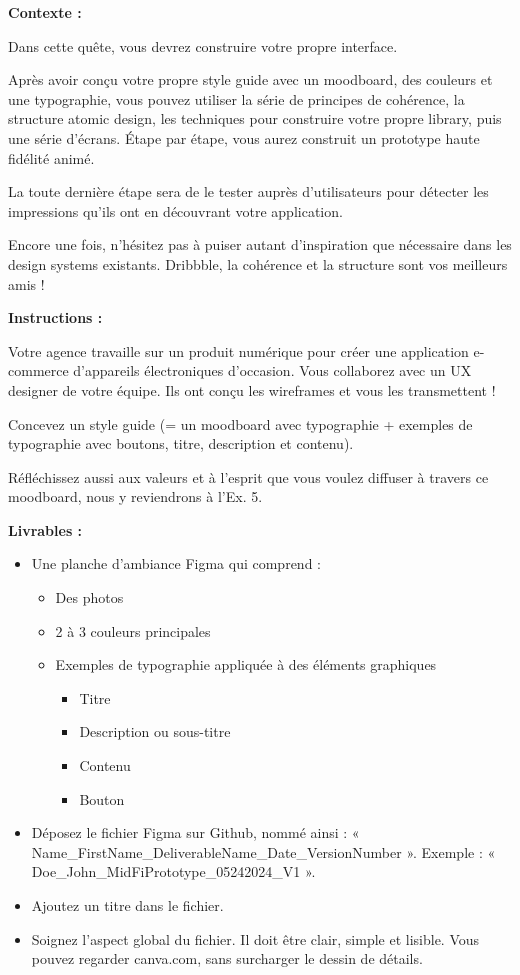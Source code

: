 \makeheaderfiles

\textbf{Contexte :}

Dans cette quête, vous devrez construire votre propre interface.

Après avoir conçu votre propre style guide avec un moodboard, des couleurs et une typographie, vous pouvez utiliser la série de principes de cohérence, la structure atomic design, les techniques pour construire votre propre library, puis une série d'écrans. Étape par étape, vous aurez construit un prototype haute fidélité animé.

La toute dernière étape sera de le tester auprès d'utilisateurs pour détecter les impressions qu'ils ont en découvrant votre application.

Encore une fois, n'hésitez pas à puiser autant d'inspiration que nécessaire dans les design systems existants. Dribbble, la cohérence et la structure sont vos meilleurs amis !

\textbf{Instructions :}

Votre agence travaille sur un produit numérique pour créer une application e-commerce d'appareils électroniques d'occasion. Vous collaborez avec un UX designer de votre équipe. Ils ont conçu les wireframes et vous les transmettent !

Concevez un style guide (= un moodboard avec typographie + exemples de typographie avec boutons, titre, description et contenu).

Réfléchissez aussi aux valeurs et à l'esprit que vous voulez diffuser à travers ce moodboard, nous y reviendrons à l'Ex. 5.

\textbf{Livrables :}

\begin{itemize}
\item Une planche d'ambiance Figma qui comprend :
\begin{itemize}
\item Des photos
\item 2 à 3 couleurs principales
\item Exemples de typographie appliquée à des éléments graphiques
\begin{itemize}
\item Titre
\item Description ou sous-titre
\item Contenu
\item Bouton
\end{itemize}
\end{itemize}
\item Déposez le fichier Figma sur Github, nommé ainsi : « Name\_FirstName\_DeliverableName\_Date\_VersionNumber ». Exemple : « Doe\_John\_MidFiPrototype\_05242024\_V1 ».
\item Ajoutez un titre dans le fichier.
\item Soignez l'aspect global du fichier. Il doit être clair, simple et lisible. Vous pouvez regarder canva.com, sans surcharger le dessin de détails.
\end{itemize}

